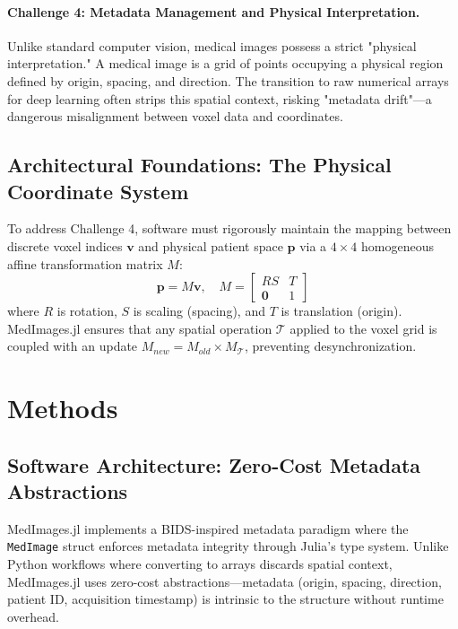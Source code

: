 \documentclass[10pt,letterpaper]{article}
\begin{document}
\paragraph{Challenge 4: Metadata Management and Physical Interpretation.}
Unlike standard computer vision, medical images possess a strict "physical interpretation." A medical image is a grid of points occupying a physical region defined by origin, spacing, and direction. The transition to raw numerical arrays for deep learning often strips this spatial context, risking "metadata drift"—a dangerous misalignment between voxel data and coordinates.

\subsection*{Architectural Foundations: The Physical Coordinate System}
To address Challenge 4, software must rigorously maintain the mapping between discrete voxel indices $\mathbf{v}$ and physical patient space $\mathbf{p}$ via a $4 \times 4$ homogeneous affine transformation matrix $M$:
\begin{equation}
\mathbf{p} = M \mathbf{v}, \quad M = 
\begin{bmatrix} 
R S & T \\
\mathbf{0} & 1
\end{bmatrix}
\end{equation}
where $R$ is rotation, $S$ is scaling (spacing), and $T$ is translation (origin). MedImages.jl ensures that any spatial operation $\mathcal{T}$ applied to the voxel grid is coupled with an update $M_{new} = M_{old} \times M_{\mathcal{T}}$, preventing desynchronization.

\section{Methods}

\subsection*{Software Architecture: Zero-Cost Metadata Abstractions}
MedImages.jl implements a BIDS-inspired metadata paradigm where the \texttt{MedImage} struct enforces metadata integrity through Julia's type system. Unlike Python workflows where converting to arrays discards spatial context, MedImages.jl uses zero-cost abstractions—metadata (origin, spacing, direction, patient ID, acquisition timestamp) is intrinsic to the structure without runtime overhead.
\end{document}
